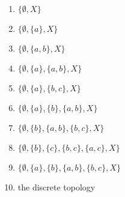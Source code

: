 \begin{multicols}{2}
\begin{enumerate}[1.]

\item $\{\emptyset, X\}$

\item $\{\emptyset, \{a\}, X\}$

\item $\{\emptyset, \{a,b\}, X\}$

\item $\{\emptyset, \{a\}, \{a,b\}, X\}$

\item $\{\emptyset, \{a\}, \{b,c\}, X\}$

\item $\{\emptyset, \{a\}, \{b\}, \{a,b\}, X\}$

\item $\{\emptyset, \{b\}, \{a,b\}, \{b,c\}, X\}$

\item $\{\emptyset, \{b\}, \{c\}, \{b,c\}, \{a,c\}, X\}$

\item $\{\emptyset, \{a\}, \{b\}, \{a,b\}, \{b,c\}, X\}$

\item the discrete topology

\end{enumerate}

\end{multicols}

\ea


